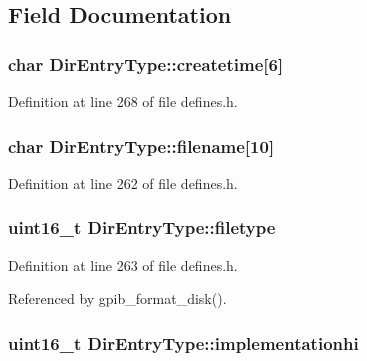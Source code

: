 \subsection{Field Documentation}
\subsubsection[{\texorpdfstring{createtime}{createtime}}]{\setlength{\rightskip}{0pt plus 5cm}char Dir\+Entry\+Type\+::createtime\mbox{[}6\mbox{]}}\hypertarget{structDirEntryType_a627fd55537c73d4fee596b140e106c01}{}\label{structDirEntryType_a627fd55537c73d4fee596b140e106c01}


Definition at line 268 of file defines.\+h.

\subsubsection[{\texorpdfstring{filename}{filename}}]{\setlength{\rightskip}{0pt plus 5cm}char Dir\+Entry\+Type\+::filename\mbox{[}10\mbox{]}}\hypertarget{structDirEntryType_aa60fae0a6b7ba9c966cbcf46e555f396}{}\label{structDirEntryType_aa60fae0a6b7ba9c966cbcf46e555f396}


Definition at line 262 of file defines.\+h.

\subsubsection[{\texorpdfstring{filetype}{filetype}}]{\setlength{\rightskip}{0pt plus 5cm}uint16\+\_\+t Dir\+Entry\+Type\+::filetype}\hypertarget{structDirEntryType_ada14562440087858ebf04bc4c81eedd2}{}\label{structDirEntryType_ada14562440087858ebf04bc4c81eedd2}


Definition at line 263 of file defines.\+h.



Referenced by gpib\+\_\+format\+\_\+disk().

\subsubsection[{\texorpdfstring{implementationhi}{implementationhi}}]{\setlength{\rightskip}{0pt plus 5cm}uint16\+\_\+t Dir\+Entry\+Type\+::implementationhi}\hypertarget{structDirEntryType_a27a15eea3264d44c9e93e3be77093151}{}\label{structDirEntryType_a27a15eea3264d44c9e93e3be77093151}


